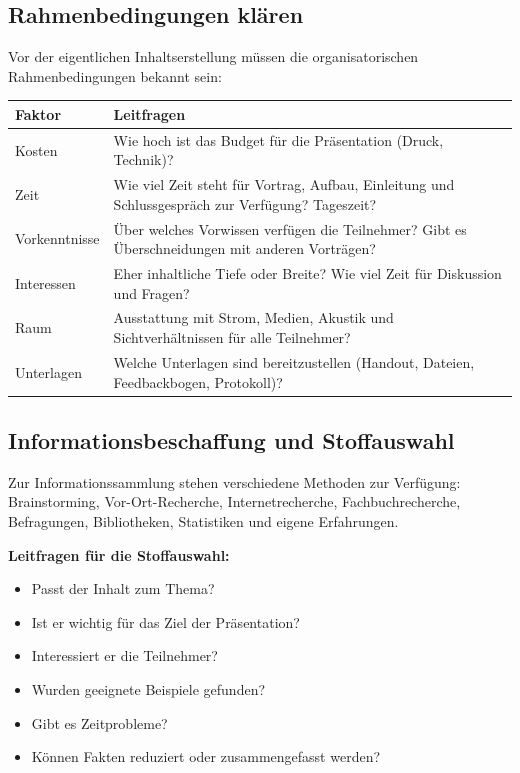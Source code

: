\documentclass[11pt, a4paper]{article}
\begin{document}
\subsection{Rahmenbedingungen klären}

Vor der eigentlichen Inhaltserstellung müssen die organisatorischen Rahmenbedingungen bekannt sein:

\begin{center}
\begin{tabular}{p{3.5cm} p{9.5cm}}
\toprule
\textbf{Faktor} & \textbf{Leitfragen}\\
\midrule
Kosten & Wie hoch ist das Budget für die Präsentation (Druck, Technik)?\\
\addlinespace
Zeit & Wie viel Zeit steht für Vortrag, Aufbau, Einleitung und Schlussgespräch zur Verfügung? Tageszeit?\\
\addlinespace
Vorkenntnisse & Über welches Vorwissen verfügen die Teilnehmer? Gibt es Überschneidungen mit anderen Vorträgen?\\
\addlinespace
Interessen & Eher inhaltliche Tiefe oder Breite? Wie viel Zeit für Diskussion und Fragen?\\
\addlinespace
Raum & Ausstattung mit Strom, Medien, Akustik und Sichtverhältnissen für alle Teilnehmer?\\
\addlinespace
Unterlagen & Welche Unterlagen sind bereit­zustellen (Handout, Dateien, Feedback­bogen, Protokoll)?\\
\bottomrule
\end{tabular}
\end{center}

\subsection{Informationsbeschaffung und Stoffauswahl}

Zur Informationssammlung stehen verschiedene Methoden zur Verfügung: Brainstorming, Vor-Ort-Recherche,
Internetrecherche, Fachbuchrecherche, Befragungen, Bibliotheken, Statistiken und eigene Erfahrungen.

\textbf{Leitfragen für die Stoffauswahl:}

\begin{itemize}
  \item Passt der Inhalt zum Thema?
  \item Ist er wichtig für das Ziel der Präsentation?
  \item Interessiert er die Teilnehmer?
  \item Wurden geeignete Beispiele gefunden?
  \item Gibt es Zeitprobleme?
  \item Können Fakten reduziert oder zusammengefasst werden?
\end{itemize}
\end{document}
